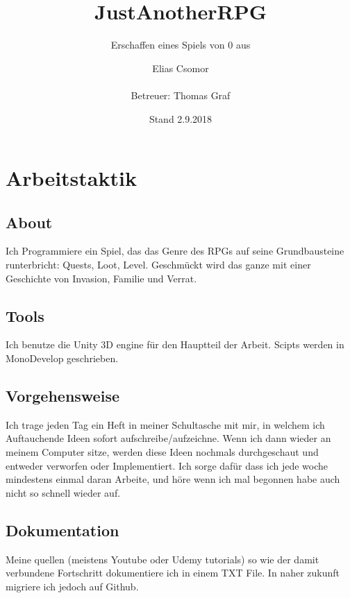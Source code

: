 \documentclass[a4paper,twoside,openright]{scrreprt}
\title{JustAnotherRPG}
\subtitle{Erschaffen eines Spiels von 0 aus}
\author{\texorpdfstring{Elias Csomor\\[1cm]\\[1cm] {\small Betreuer: Thomas Graf}}{Hans Muster}}
\date{\small Stand 2.9.2018}
\begin{document}
\maketitle %
\cleardoublepage
{} %
\tableofcontents %
\cleardoublepage %

\section{Arbeitstaktik}


\subsection{About}

Ich Programmiere ein Spiel, das das Genre des RPGs auf seine Grundbausteine runterbricht: Quests, Loot, Level. Geschmückt wird das ganze mit einer Geschichte von Invasion, Familie und Verrat.

\subsection{Tools}
Ich benutze die Unity 3D engine für den Hauptteil der Arbeit. Scipts werden in MonoDevelop geschrieben.

\subsection{Vorgehensweise} Ich trage jeden Tag ein Heft in meiner Schultasche mit mir, in welchem ich Auftauchende Ideen sofort aufschreibe/aufzeichne.
Wenn ich dann wieder an meinem Computer sitze, werden diese Ideen nochmals durchgeschaut und entweder verworfen oder Implementiert.
Ich sorge dafür dass ich jede woche mindestens einmal daran Arbeite, und höre wenn ich mal begonnen habe auch nicht so schnell wieder auf.
 \subsection{Dokumentation}
Meine quellen (meistens Youtube oder Udemy tutorials) so wie der damit verbundene Fortschritt dokumentiere ich in einem TXT File.
In naher zukunft migriere ich jedoch auf Github.



\appendix %
\listoffigures %
\listoftables  %
\end{document}
